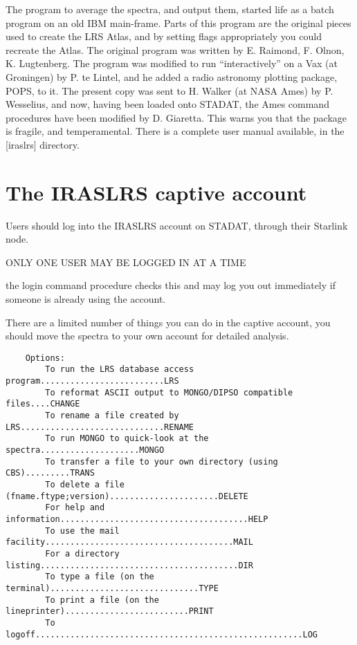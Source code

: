 The program to average the spectra, and output them, started life as a batch
program on an old IBM main-frame. 
Parts of this program are the original pieces used to create the LRS Atlas,
and by setting flags appropriately you could recreate the Atlas. 
The original program was written by E. Raimond, F. Olnon, K. Lugtenberg. 
The program was modified to run ``interactively'' on a Vax (at Groningen)
by P. te Lintel, and he added a radio astronomy plotting package, POPS, to it.
The present copy was sent to H. Walker (at NASA Ames) by P. Wesselius, and
now, having been loaded onto STADAT, the Ames command procedures have been 
modified by D. Giaretta.
This warns you that the package is fragile, and temperamental.
There is a complete user manual available, in the [iraslrs] directory.

\section{The IRASLRS captive account}

Users should log into the IRASLRS account on STADAT, through their Starlink 
node.
\begin{center}
ONLY ONE USER MAY BE LOGGED IN AT A TIME 
\end{center}
the login command procedure checks this and may log you out 
immediately if someone is already using the account.

There are a limited number of things you can do in the captive account, you
should move the spectra to your own account for detailed analysis.
\begin{verbatim}
    Options:
        To run the LRS database access program.........................LRS
        To reformat ASCII output to MONGO/DIPSO compatible files....CHANGE
        To rename a file created by LRS.............................RENAME
        To run MONGO to quick-look at the spectra....................MONGO
        To transfer a file to your own directory (using CBS).........TRANS
        To delete a file (fname.ftype;version)......................DELETE
        For help and information......................................HELP
        To use the mail facility......................................MAIL
        For a directory listing........................................DIR
        To type a file (on the terminal)..............................TYPE
        To print a file (on the lineprinter).........................PRINT
        To logoff......................................................LOG
\end{verbatim}

